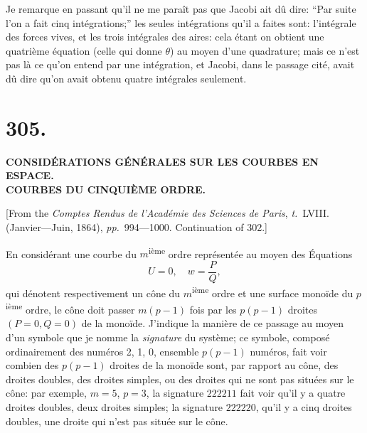 \documentclass[11pt,a4paper]{article}
\newcommand{\tome}{\textit{t.}}
\newcommand{\pages}{\textit{pp.}}
\begin{document}
Je remarque en passant qu'il ne me para\^{i}t pas que Jacobi ait d\^{u} dire: ``Par suite l'on a fait cinq int\'{e}grations;'' les seules int\'{e}grations qu'il a faites sont: l'int\'{e}grale des forces vives, et les trois int\'{e}grales des aires: cela \'{e}tant on obtient une quatri\`{e}me \'{e}quation (celle qui donne $\theta$) au moyen d'une quadrature; mais ce n'est pas l\`{a} ce qu'on entend par une int\'{e}gration, et Jacobi, dans le passage cit\'{e}, avait d\^{u} dire qu'on avait obtenu quatre int\'{e}grales seulement.

\clearpage

\section*{305.}

\begin{center}
\textbf{CONSID\'{E}RATIONS G\'{E}N\'{E}RALES SUR LES COURBES EN ESPACE.}\\[0.5em]
\textbf{COURBES DU CINQUI\`{E}ME ORDRE.}
\end{center}

[From the \textit{Comptes Rendus de l'Acad\'{e}mie des Sciences de Paris}, \tome~LVIII. (Janvier---Juin, 1864), \pages~994---1000. Continuation of 302.]

\medskip

En consid\'{e}rant une courbe du $m$\textsuperscript{i\`{e}me} ordre repr\'{e}sent\'{e}e au moyen des \'{E}quations
\[
U = 0, \quad w = \frac{P}{Q},
\]
qui d\'{e}notent respectivement un c\^{o}ne du $m$\textsuperscript{i\`{e}me} ordre et une surface mono\"{i}de du $p$\textsuperscript{i\`{e}me} ordre, le c\^{o}ne doit passer $m(p-1)$ fois par les $p(p-1)$ droites $(P = 0, Q = 0)$ de la mono\"{i}de. J'indique la mani\`{e}re de ce passage au moyen d'un symbole que je nomme la \textit{signature} du syst\`{e}me; ce symbole, compos\'{e} ordinairement des num\'{e}ros 2, 1, 0, ensemble $p(p-1)$ num\'{e}ros, fait voir combien des $p(p-1)$ droites de la mono\"{i}de sont, par rapport au c\^{o}ne, des droites doubles, des droites simples, ou des droites qui ne sont pas situ\'{e}es sur le c\^{o}ne: par exemple, $m = 5$, $p = 3$, la signature $222211$ fait voir qu'il y a quatre droites doubles, deux droites simples; la signature $222220$, qu'il y a cinq droites doubles, une droite qui n'est pas situ\'{e}e sur le c\^{o}ne.
\end{document}
